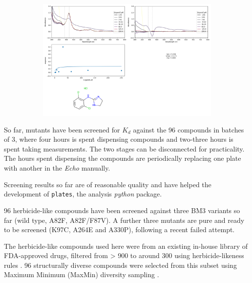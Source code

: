 \documentclass{article}
\begin{document}
\begin{centering}
\begin{figure}[H]
\begin{subfigure}{0.7\textwidth}
		\includegraphics[width=\linewidth]{figs/32.png}
	\end{subfigure}
\end{figure}
\end{centering}
\restoregeometry

\par
So far, mutants have been screened for $K_d$ against the 96 compounds in batches of 3, where four hours is spent dispensing compounds and two-three hours is spent taking measurements. The two stages can be disconnected for practicality. The hours spent dispensing the compounds are periodically replacing one plate with another in the \textit{Echo} manually.
\par
Screening results so far are of reasonable quality and have helped the development of \texttt{plates}, the analysis \textit{python} package.   %
\par
96 herbicide-like compounds have been screened against three BM3 variants so far (wild type, A82F, A82F/F87V). A further three mutants are pure and ready to be screened (K97C, A264E and A330P), following a recent failed attempt. 
\par
The herbicide-like compounds used here were from an existing in-house library of FDA-approved drugs, filtered from > 900 to around 300 using herbicide-likeness rules \cite{avram2014quantitative}. 96 structurally diverse compounds were selected from this subset using Maximum Minimum (MaxMin) diversity sampling \cite{porumbel2011simple}.
\par
\end{document}
